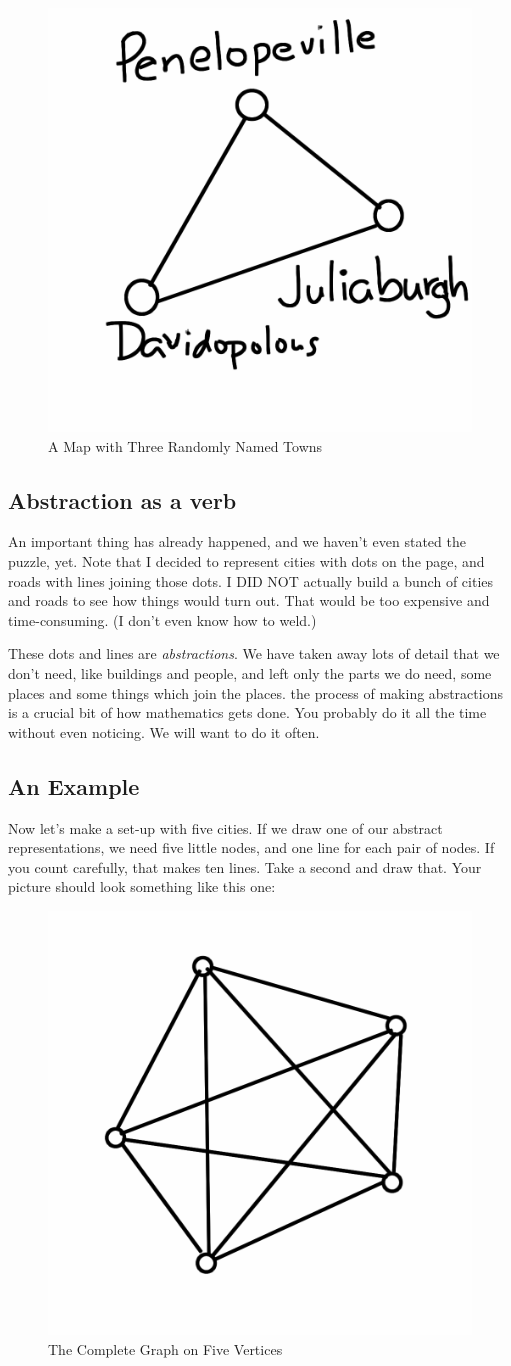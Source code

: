 \documentclass[12pt,letterpaper]{article}
\theoremstyle{definition}
\begin{document}
\begin{figure}[h]
\centering
\includegraphics[width=.4\textwidth]{images/ThreeTowns.png}
\caption{A Map with Three Randomly Named Towns}
\end{figure}


\subsection*{Abstraction as a verb}

An important thing has already happened, and we haven't even stated the puzzle, yet.  Note that I decided to represent cities with dots on the page, and roads with lines joining those dots. I DID NOT actually build a bunch of cities and roads to see how things would turn out. That would be too expensive and time-consuming. (I don't even know
how to weld.)

These dots and lines are \emph{abstractions}. We have taken away lots of detail that we don't need, like buildings and people, and left only the parts we do need, some places and some things which join the places. the process of making abstractions is a crucial bit of how mathematics gets done. You probably do it all the time without even noticing. We will want to do it often.

\subsection*{An Example}

Now let's make a set-up with five cities. If we draw one of our abstract representations, we need five little nodes,
and one line for each pair of nodes. If you count carefully, that makes ten lines. Take a second and draw that. 
Your picture should look something like this one:

\begin{figure}[h]
\centering
\includegraphics[width=.5\textwidth]{images/k5.png}
\caption{The Complete Graph on Five Vertices}
\end{figure}
\end{document}
